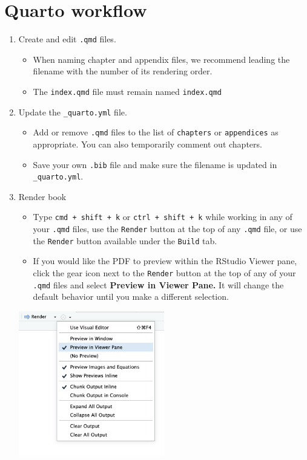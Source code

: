 \documentclass[
  11pt,
  letterpaper,
  twoside]{report}
\providecommand{\tightlist}{%
  \setlength{\itemsep}{0pt}\setlength{\parskip}{0pt}}\usepackage{longtable,booktabs,array}
\begin{document}
\section{Quarto workflow}\label{quarto-workflow}

\begin{enumerate}
\def\labelenumi{\arabic{enumi}.}
\item
  Create and edit \texttt{.qmd} files.

  \begin{itemize}
  \tightlist
  \item
    When naming chapter and appendix files, we recommend leading the
    filename with the number of its rendering order.
  \item
    The \texttt{index.qmd} file must remain named \texttt{index.qmd}
  \end{itemize}
\item
  Update the \texttt{\_quarto.yml} file.

  \begin{itemize}
  \tightlist
  \item
    Add or remove \texttt{.qmd} files to the list of \texttt{chapters}
    or \texttt{appendices} as appropriate. You can also temporarily
    comment out chapters.
  \item
    Save your own \texttt{.bib} file and make sure the filename is
    updated in \texttt{\_quarto.yml}.
  \end{itemize}
\item
  Render book

  \begin{itemize}
  \tightlist
  \item
    Type \texttt{cmd\ +\ shift\ +\ k} or \texttt{ctrl\ +\ shift\ +\ k}
    while working in any of your \texttt{.qmd} files, use the
    \texttt{Render} button at the top of any \texttt{.qmd} file, or use
    the \texttt{Render} button available under the \texttt{Build} tab.
  \item
    If you would like the PDF to preview within the RStudio Viewer pane,
    click the gear icon next to the \texttt{Render} button at the top of
    any of your \texttt{.qmd} files and select \textbf{Preview in Viewer
    Pane.} It will change the default behavior until you make a
    different selection.
  \end{itemize}

  \begin{center}
  \includegraphics[width=0.5\textwidth,height=\textheight]{fig/temp_preview-viewer-pane.png}
  \end{center}


\end{enumerate}
\end{document}
